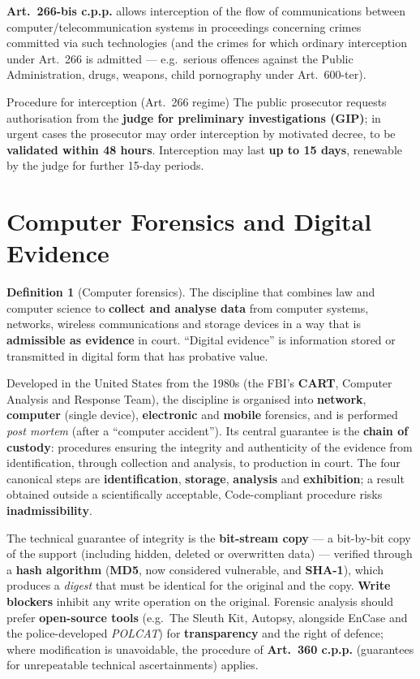 \documentclass[11pt,a4paper,openany]{report}
\theoremstyle{definition}
\newtheorem{definition}{Definition}[chapter]
\theoremstyle{plain}
\theoremstyle{remark}
\begin{document}
\textbf{Art.\ 266-bis c.p.p.} allows interception of the flow of communications between computer/telecommunication systems in proceedings concerning crimes committed via such technologies (and the crimes for which ordinary interception under Art.\ 266 is admitted --- e.g.\ serious offences against the Public Administration, drugs, weapons, child pornography under Art.\ 600-ter).

\begin{sidebox}{Procedure for interception (Art.\ 266 regime)}
The public prosecutor requests authorisation from the \textbf{judge for preliminary investigations (GIP)}; in urgent cases the prosecutor may order interception by motivated decree, to be \textbf{validated within 48 hours}. Interception may last \textbf{up to 15 days}, renewable by the judge for further 15-day periods.
\end{sidebox}

\section{Computer Forensics and Digital Evidence}

\begin{definition}[Computer forensics]
The discipline that combines law and computer science to \textbf{collect and analyse data} from computer systems, networks, wireless communications and storage devices in a way that is \textbf{admissible as evidence} in court. ``Digital evidence'' is information stored or transmitted in digital form that has probative value.
\end{definition}

Developed in the United States from the 1980s (the FBI's \textbf{CART}, Computer Analysis and Response Team), the discipline is organised into \textbf{network}, \textbf{computer} (single device), \textbf{electronic} and \textbf{mobile} forensics, and is performed \emph{post mortem} (after a ``computer accident''). Its central guarantee is the \textbf{chain of custody}: procedures ensuring the integrity and authenticity of the evidence from identification, through collection and analysis, to production in court. The four canonical steps are \textbf{identification}, \textbf{storage}, \textbf{analysis} and \textbf{exhibition}; a result obtained outside a scientifically acceptable, Code-compliant procedure risks \textbf{inadmissibility}.

\begin{keypoint}
The technical guarantee of integrity is the \textbf{bit-stream copy} --- a bit-by-bit copy of the support (including hidden, deleted or overwritten data) --- verified through a \textbf{hash algorithm} (\textbf{MD5}, now considered vulnerable, and \textbf{SHA-1}), which produces a \emph{digest} that must be identical for the original and the copy. \textbf{Write blockers} inhibit any write operation on the original. Forensic analysis should prefer \textbf{open-source tools} (e.g.\ The Sleuth Kit, Autopsy, alongside EnCase and the police-developed \emph{POLCAT}) for \textbf{transparency} and the right of defence; where modification is unavoidable, the procedure of \textbf{Art.\ 360 c.p.p.} (guarantees for unrepeatable technical ascertainments) applies.
\end{keypoint}
\end{document}
